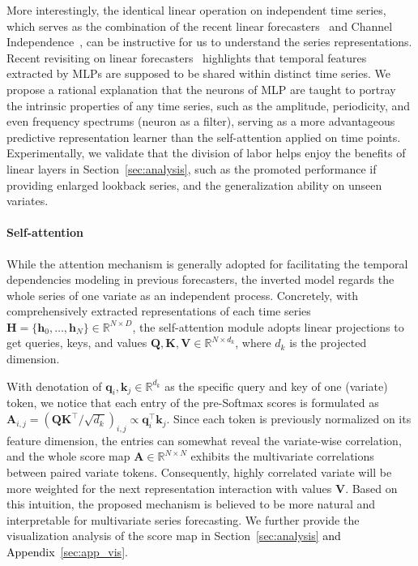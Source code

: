 \documentclass{article} %
\newcommand{\update}[1]{{\textcolor{black}{#1}}}
\begin{document}
More interestingly, the identical linear operation on independent time series, which serves as the combination of the recent linear forecasters~\citep{DLinear} and Channel Independence~\citep{PatchTST}, can be instructive for us to understand the series representations. Recent revisiting on linear forecasters~\citep{li2023revisiting} highlights that temporal features extracted by MLPs are supposed to be shared within distinct time series. We propose a rational explanation that the neurons of MLP are taught to portray the intrinsic properties of any time series, such as the amplitude, periodicity, and even frequency spectrums (neuron as a filter), serving as a more advantageous predictive representation learner than the self-attention applied on time points. Experimentally, we validate that the division of labor helps enjoy the benefits of linear layers in Section~\ref{sec:analysis}, such as the promoted performance if providing enlarged lookback series, and the generalization ability on unseen variates.


\paragraph{Self-attention} While the attention mechanism is generally adopted for facilitating the temporal dependencies modeling in previous forecasters, the inverted model regards the whole series of one variate as an independent process. Concretely, with comprehensively extracted representations of each time series $\mathbf{H}=\{\mathbf{h}_0,\ldots,\mathbf{h}_{N}\}\in\mathbb{R}^{N\times D}$, the self-attention module adopts linear projections to get queries, keys, and values $\mathbf{Q}, \mathbf{K}, \mathbf{V} \in \mathbb{R}^{N\times d_k}$, where $d_k$ is the projected dimension.

With denotation of $\mathbf{q}_i, \mathbf{k}_j\in\mathbb{R}^{d_k}$ as the specific query and key of one (variate) token, we notice that each entry of the pre-Softmax scores is formulated as $\mathbf{A}_{i, j}=(\mathbf{Q}\mathbf{K}^\top / \sqrt{d_k})_{i, j} \propto \mathbf{q}_i^{\top}\mathbf{k}_j$. Since each token is previously normalized on its feature dimension, the entries can somewhat reveal the variate-wise correlation, and the whole score map $\mathbf{A} \in \mathbb{R}^{N\times N}$ exhibits the multivariate correlations between paired variate tokens. Consequently, highly correlated variate will be more weighted for the next representation interaction with values $\mathbf{V}$. Based on this intuition, the proposed mechanism is believed to be more natural and interpretable for multivariate series forecasting. We further provide the visualization analysis of the score map in Section~\ref{sec:analysis} \update{and Appendix~\ref{sec:app_vis}}.
\end{document}
